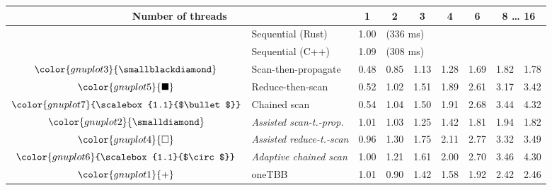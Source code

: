 \begin{tabular}{clrrrrrrr}
\toprule
\multicolumn{2}{c}{\textbf{Number of threads}} & \multicolumn{1}{c}{\textbf{ 1 }} & \multicolumn{1}{c}{\textbf{ 2 }} & \multicolumn{1}{c}{\textbf{ 3 }} & \multicolumn{1}{c}{\textbf{ 4 }} & \multicolumn{1}{c}{\textbf{ 6 }} & \multicolumn{2}{c}{\textbf{ 8 } \dots \textbf{ 16 }} \\
\midrule
& Sequential (Rust) & \multicolumn{1}{r}{ 1.00 } & \multicolumn{ 6 }{l}{(336 ms)} \\
& Sequential (C++) & \multicolumn{1}{r}{ 1.09 } & \multicolumn{ 6 }{l}{(308 ms)} \\
\rowcolor{gnuplot3!10}$\color{gnuplot3}{\smallblackdiamond}$ & Scan-then-propagate & \cellcolor{gnuplot3!10} 0.48 & \cellcolor{gnuplot3!10} 0.85 & \cellcolor{gnuplot3!10} 1.13 & \cellcolor{gnuplot3!10} 1.28 & \cellcolor{gnuplot3!10} 1.69 & \cellcolor{gnuplot3!10} 1.82 & \cellcolor{gnuplot3!10} 1.78 \\
\rowcolor{gnuplot5!10}$\color{gnuplot5}{\blacksquare}$ & Reduce-then-scan & \cellcolor{gnuplot5!10} 0.52 & \cellcolor{gnuplot5!10} 1.02 & \cellcolor{gnuplot5!10} 1.51 & \cellcolor{gnuplot5!10} 1.89 & \cellcolor{gnuplot5!10} 2.61 & \cellcolor{gnuplot5!10} 3.17 & \cellcolor{gnuplot5!10} 3.42 \\
\rowcolor{gnuplot7!10}$\color{gnuplot7}{\scalebox{1.1}{$\bullet$}}$ & Chained scan & \cellcolor{gnuplot7!10} 0.54 & \cellcolor{gnuplot7!10} 1.04 & \cellcolor{gnuplot7!10} 1.50 & \cellcolor{gnuplot7!10} 1.91 & \cellcolor{gnuplot7!10} 2.68 & \cellcolor{gnuplot7!10} 3.44 & \cellcolor{gnuplot7!10} 4.32 \\
\rowcolor{gnuplot2!30}$\color{gnuplot2}{\smalldiamond}$ & \textit{Assisted scan-t.-prop.} & \cellcolor{gnuplot2!30} 1.01 & \cellcolor{gnuplot2!30} 1.03 & \cellcolor{gnuplot2!30} 1.25 & \cellcolor{gnuplot2!30} 1.42 & \cellcolor{gnuplot2!30} 1.81 & \cellcolor{gnuplot2!30} 1.94 & \cellcolor{gnuplot2!30} 1.82 \\
\rowcolor{gnuplot4!30}$\color{gnuplot4}{\square}$ & \textit{Assisted reduce-t.-scan} & \cellcolor{gnuplot4!30} 0.96 & \cellcolor{gnuplot4!30} 1.30 & \cellcolor{gnuplot4!30} 1.75 & \cellcolor{gnuplot4!30} 2.11 & \cellcolor{gnuplot4!30} 2.77 & \cellcolor{gnuplot4!30} 3.32 & \cellcolor{gnuplot4!30} 3.49 \\
\rowcolor{gnuplot6!30}$\color{gnuplot6}{\scalebox{1.1}{$\circ$}}$ & \textit{Adaptive chained scan} & \cellcolor{gnuplot6!30} 1.00 & \cellcolor{gnuplot6!30} 1.21 & \cellcolor{gnuplot6!30} 1.61 & \cellcolor{gnuplot6!30} 2.00 & \cellcolor{gnuplot6!30} 2.70 & \cellcolor{gnuplot6!30} 3.46 & \cellcolor{gnuplot6!30} 4.30 \\
\rowcolor{gnuplot1!10}$\color{gnuplot1}{+}$ & oneTBB & \cellcolor{gnuplot1!10} 1.01 & \cellcolor{gnuplot1!10} 0.90 & \cellcolor{gnuplot1!10} 1.42 & \cellcolor{gnuplot1!10} 1.58 & \cellcolor{gnuplot1!10} 1.92 & \cellcolor{gnuplot1!10} 2.42 & \cellcolor{gnuplot1!10} 2.46 \\
\bottomrule
\end{tabular}
